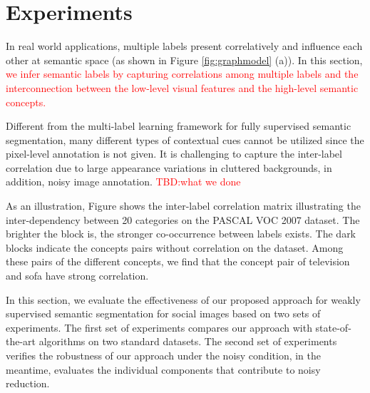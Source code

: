 \section{Experiments}
\if
In real world applications, multiple labels present correlatively and influence each other at semantic space (as shown in Figure \ref{fig:graphmodel} (a)). In this section, {\textcolor{red}{we infer semantic labels by capturing correlations among multiple labels and the interconnection between the low-level visual features and the high-level semantic concepts.}}

Different from the multi-label learning framework for fully supervised semantic segmentation, many different types of contextual cues cannot be utilized since the pixel-level annotation is not given. It is challenging to capture the inter-label correlation due to large appearance variations in cluttered backgrounds, in addition, noisy image annotation. {\textcolor{red}{TBD:what we done}}

As an illustration, Figure shows the inter-label correlation matrix illustrating the inter-dependency between 20 categories on the PASCAL VOC 2007 dataset. The brighter the block is, the stronger co-occurrence between labels exists. The dark blocks indicate the concepts pairs without correlation on the dataset.
Among these pairs of the different concepts, we find that the concept pair of television and sofa have strong correlation.
\fi

In this section, we evaluate the effectiveness of our proposed approach for weakly supervised semantic segmentation for social images based on two sets of experiments. The first set of experiments compares our approach with state-of-the-art algorithms on two standard datasets. The second set of experiments verifies the robustness of our approach under the noisy condition, in the meantime, evaluates the individual components that contribute to noisy reduction.


